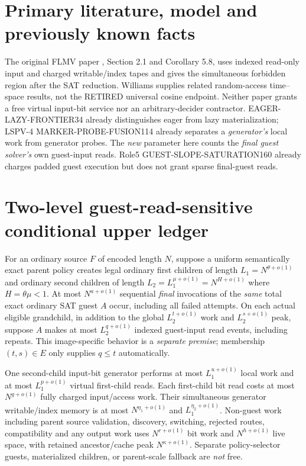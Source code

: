 \documentclass[11pt]{article}
\begin{document}
\section{Primary literature, model and previously known facts}
The original FLMV paper \cite{FLMV}, Section 2.1 and Corollary 5.8,
uses indexed read-only input and charged writable/index tapes and gives
the simultaneous forbidden region after the SAT reduction. Williams
\cite{Williams} supplies related random-access time--space results,
not the RETIRED universal cosine endpoint. Neither paper grants a
free virtual input-bit service nor an arbitrary-decider contractor.
EAGER-LAZY-FRONTIER34 already distinguishes eager from lazy
materialization; LSPV-4 MARKER-PROBE-FUSION114 already separates a
\emph{generator's} local work from generator probes. The \emph{new}
parameter here counts the \emph{final guest solver's} own guest-input
reads. Role5 GUEST-SLOPE-SATURATION160 already charges padded guest
execution but does not grant sparse final-guest reads.

\section{Two-level guest-read-sensitive conditional upper ledger}
For an ordinary source $F$ of encoded length $N$, suppose a uniform
semantically exact parent policy creates legal ordinary first children
of length $L_1=N^{\theta+o(1)}$ and ordinary second children of length
$L_2=L_1^{\mu+o(1)}=N^{H+o(1)}$ where $H=\theta\mu<1$.
At most $N^{a+o(1)}$ sequential \emph{final} invocations of the
\emph{same} total exact ordinary SAT guest $A$ occur, including all
failed attempts. On each actual eligible grandchild, in addition to
the global $L_2^{t+o(1)}$ work and $L_2^{s+o(1)}$ peak, suppose $A$
makes at most $L_2^{q+o(1)}$ indexed guest-input read events,
including repeats. This image-specific behavior is a \emph{separate
premise}; membership $(t,s)\in E$ only supplies $q\le t$ automatically.

One second-child input-bit generator performs at most
$L_1^{u+o(1)}$ local work and at most $L_1^{p+o(1)}$ virtual
first-child reads. Each first-child bit read costs at most
$N^{g+o(1)}$ fully charged input/access work. Their simultaneous
generator writable/index memory is at most $N^{\eta_1+o(1)}$
and $L_1^{\eta_2+o(1)}$. Non-guest work including parent source
validation, discovery, switching, rejected routes, compatibility
and any output work uses $N^{r+o(1)}$ bit work and
$N^{h+o(1)}$ live space, with retained ancestor/cache peak
$N^{\kappa+o(1)}$. Separate policy-selector guests,
materialized children, or parent-scale fallback are \emph{not} free.
\end{document}
